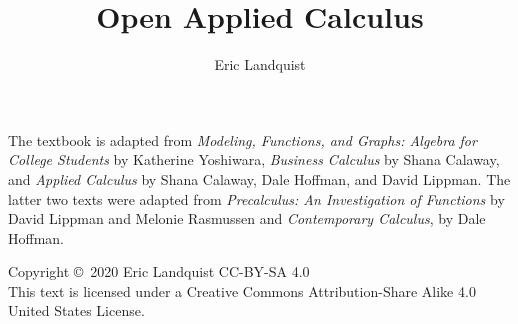 \documentclass{book}
\newcommand{\<}{\left\langle}
\renewcommand{\>}{\right\rangle}
\theoremstyle{definition}
\begin{document}

\title{Open Applied Calculus}
\author{Eric Landquist}
\maketitle


\thispagestyle{empty}
The textbook is adapted from {\em Modeling, Functions, and Graphs: Algebra for College Students} by Katherine Yoshiwara, {\em Business Calculus} by Shana Calaway, and {\em Applied Calculus} by Shana Calaway, Dale Hoffman, and David Lippman. The latter two texts were adapted from {\em Precalculus: An Investigation of Functions} by David Lippman and Melonie Rasmussen and {\em Contemporary Calculus}, by Dale Hoffman.

\noindent Copyright \copyright\ 2020 Eric Landquist CC-BY-SA 4.0\\ %

\noindent This text is licensed under a Creative Commons Attribution-Share Alike 4.0 United
States License.\\
\end{document}
